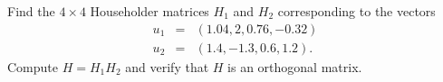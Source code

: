 \begin{exercise}  \label{c7.5.6}
Find the $4\times 4$ Householder matrices $H_1$ and $H_2$ corresponding to
the vectors
\begin{equation*}
\begin{array}{rcl}
u_1 & = & (1.04,2,0.76,-0.32) \\
u_2 & = & (1.4,-1.3,0.6,1.2).
\end{array}
\end{equation*}
Compute $H=H_1H_2$ and verify that $H$ is an orthogonal matrix.
\end{exercise}




